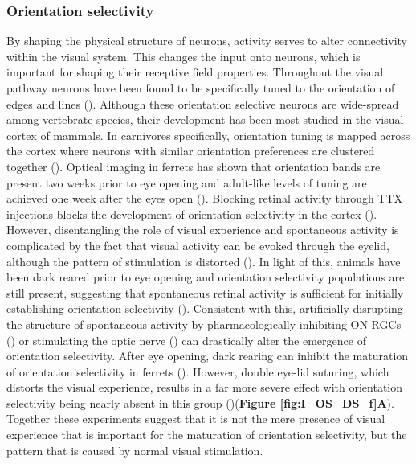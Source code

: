 \subsubsection{Orientation selectivity}
 By shaping the physical structure of neurons, activity serves to alter connectivity within the visual system. This changes the input onto neurons, which is important for shaping their receptive field properties. Throughout the visual pathway neurons have been found to be specifically tuned to the orientation of edges and lines (\cite{Hubel1968ReceptiveCortex, Passaglia2002, Niell2008HighlyCortex,Nikolaou2012ParametricTectum,Fisher2015OrientationDrosophila}). Although these orientation selective neurons are wide-spread among vertebrate species, their development has been most studied in the visual cortex of mammals. In carnivores specifically, orientation tuning is mapped across the cortex where neurons with similar orientation preferences are clustered together (\cite{Maldonado1997OrientationCortex}). Optical imaging in ferrets has shown that orientation bands are present two weeks prior to eye opening and adult-like levels of tuning are achieved one week after the eyes open (\cite{Chapman1999DevelopmentCortex}). Blocking retinal activity through TTX injections blocks the development of orientation selectivity in the cortex (\cite{Chapman1993DevelopmentDeprivation}). However, disentangling the role of visual experience and spontaneous activity is complicated by the fact that visual activity can be evoked through the eyelid, although the pattern of stimulation is distorted (\cite{Krug2001ResponsesLids, Spear1978StriateEyelids}). In light of this, animals have been dark reared prior to eye opening and orientation selectivity populations are still present, suggesting that spontaneous retinal activity is sufficient for initially establishing orientation selectivity (\cite{White2001TheCortex}). Consistent with this, artificially disrupting the structure of spontaneous activity by pharmacologically inhibiting ON-RGCs (\cite{Chapman2000CorticalActivity}) or stimulating the optic nerve (\cite{Weliky1997DisruptionActivity}) can drastically alter the emergence of orientation selectivity. After eye opening, dark rearing can inhibit the maturation of orientation selectivity in ferrets (\cite{White2001TheCortex}). However, double eye-lid suturing, which distorts the visual experience, results in a far more severe effect with orientation selectivity being nearly absent in this group (\cite{Chapman1993DevelopmentDeprivation, White2001TheCortex})(\textbf{Figure \ref{fig:I_OS_DS_f}A}). Together these experiments suggest that it is not the mere presence of visual experience that is important for the maturation of orientation selectivity, but the pattern that is caused by normal visual stimulation. 
 
